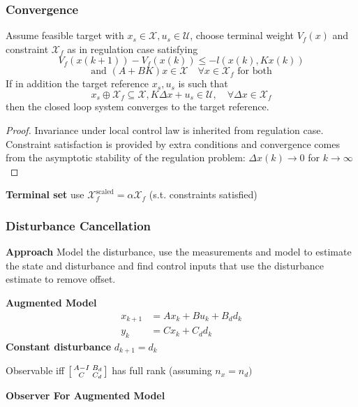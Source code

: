 \subsubsection{Convergence}

Assume feasible target with
$x_s \in \mathcal{X}, u_s \in \mathcal{U}$,
choose terminal weight $V_f(x)$ and constraint $\mathcal{X}_f$
as in regulation case satisfying
\[
	V_f(x(k+1)) - V_f(x(k)) \leq -l(x(k), Kx(k))
\]
\[
	\text{and }
	(A+BK) x \in \mathcal{X} \quad \forall x \in \mathcal{X}_f
	\text{ for both}
\]
If in addition the target reference $x_s, u_s$ is such that
\[
	x_s \oplus \mathcal{X}_f \subseteq \mathcal{X}, K\Delta x + u_s \in \mathcal{U}, \quad \forall \Delta x \in \mathcal{X}_f
\]
then the closed loop system converges to the target reference.

\begin{proof}
	Invariance under local control law is inherited from regulation case.
	Constraint satisfaction is provided by extra conditions and
	convergence comes from the asymptotic stability of the regulation problem:
	$\Delta x(k)\rightarrow0$ for $k\rightarrow\infty$
\end{proof}

\textbf{Terminal set} use
$\mathcal{X}_f^{\text{scaled}} = \alpha \mathcal{X}_f$
(s.t. constraints satisfied)


\subsubsection{Disturbance Cancellation}


\textbf{Approach}
Model the disturbance,
use the measurements and model
to estimate the state and disturbance
and find control inputs that use
the disturbance estimate to remove offset.

\textbf{Augmented Model}
\begin{align*}
	x_{k+1} & = Ax_k + Bu_k + B_d d_k \\
	y_k     & = Cx_k + C_d d_k
\end{align*}
\textbf{Constant disturbance}
$d_{k+1}  = d_k$

Observable iff
$\begin{bsmallmatrix}
		A - I & B_d \\ C & C_d
	\end{bsmallmatrix}$
has full rank (assuming $n_x = n_d)$

\textbf{Observer For Augmented Model}

